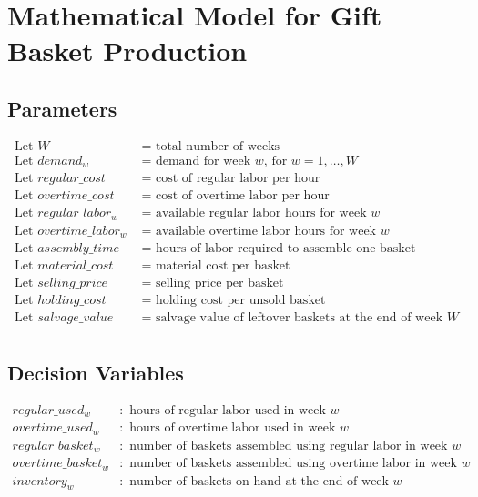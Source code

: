 \documentclass{article}
\begin{document}
\section*{Mathematical Model for Gift Basket Production}

\subsection*{Parameters}
\begin{align*}
\text{Let } W & \text{ = total number of weeks} \\
\text{Let } demand_w & \text{ = demand for week } w \text{, for } w = 1, \ldots, W \\
\text{Let } regular\_cost & \text{ = cost of regular labor per hour} \\
\text{Let } overtime\_cost & \text{ = cost of overtime labor per hour} \\
\text{Let } regular\_labor_w & \text{ = available regular labor hours for week } w \\
\text{Let } overtime\_labor_w & \text{ = available overtime labor hours for week } w \\
\text{Let } assembly\_time & \text{ = hours of labor required to assemble one basket} \\
\text{Let } material\_cost & \text{ = material cost per basket} \\
\text{Let } selling\_price & \text{ = selling price per basket} \\
\text{Let } holding\_cost & \text{ = holding cost per unsold basket} \\
\text{Let } salvage\_value & \text{ = salvage value of leftover baskets at the end of week } W \\
\end{align*}

\subsection*{Decision Variables}
\begin{align*}
regular\_used_w & : \text{ hours of regular labor used in week } w \\
overtime\_used_w & : \text{ hours of overtime labor used in week } w \\
regular\_basket_w & : \text{ number of baskets assembled using regular labor in week } w \\
overtime\_basket_w & : \text{ number of baskets assembled using overtime labor in week } w \\
inventory_w & : \text{ number of baskets on hand at the end of week } w \\
\end{align*}
\end{document}
